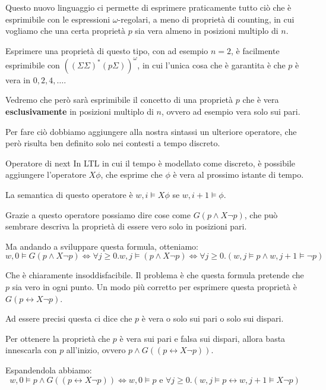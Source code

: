 Questo nuovo linguaggio ci permette di esprimere praticamente tutto ciò che è esprimibile con le espressioni \(\omega\)-regolari, a meno di proprietà di counting, in cui vogliamo che una certa proprietà \(p\) sia vera almeno in posizioni multiplo di \(n\).

Esprimere una proprietà di questo tipo, con ad esempio \(n=2\), è facilmente esprimibile con \({({(\Sigma\Sigma)}^*(p\Sigma))}^\omega\), in cui l'unica cosa che è garantita è che \(p\) è vera in \(0,2,4,\ldots\).

Vedremo che però sarà esprimibile il concetto di una proprietà \(p\) che è vera \textbf{esclusivamente} in posizioni multiplo di \(n\), ovvero ad esempio vera solo sui pari.

Per fare ciò dobbiamo aggiungere alla nostra sintassi un ulteriore operatore, che però risulta ben definito solo nei contesti a tempo discreto.

\begin{definition}[namedlabel={def:next}{Operatore di next}]{Operatore di next}
  In LTL in cui il tempo è modellato come discreto, è possibile aggiungere l'operatore \(X \phi\), che esprime che \(\phi\) è vera al prossimo istante di tempo.

  La semantica di questo operatore è \(w,i \models X\phi\) se \(w,i+1 \models \phi\).
\end{definition}


Grazie a questo operatore possiamo dire cose come \(G(p\land X \neg p)\), che può sembrare descriva la proprietà di essere vero solo in posizioni pari.

Ma andando a sviluppare questa formula, otteniamo:
\[w,0\models G(p\land X \neg p) \iff \forall j \geq 0. w,j \models (p\land X \neg p) \iff \forall j \geq 0. (w,j \models p \land w,j+1 \models \neg p)\]

Che è chiaramente insoddisfacibile. Il problema è che questa formula pretende che \(p\) sia vero in ogni punto.
Un modo più corretto per esprimere questa proprietà è \(G(p \leftrightarrow X \neg p) \).

Ad essere precisi questa ci dice che \(p\) è vera o solo sui pari o solo sui dispari.

Per ottenere la proprietà che \(p\) è vera sui pari e falsa sui dispari, allora basta innescarla con \(p\) all'inizio, ovvero \(p \land G((p \leftrightarrow X \neg p) )\).

Espandendola abbiamo:
\[w,0 \models p \land G((p \leftrightarrow X \neg p) )\iff w,0 \models p \text{ e } \forall j \geq 0. (w,j \models p \leftrightarrow w,j+1 \models X \neg p)\]

